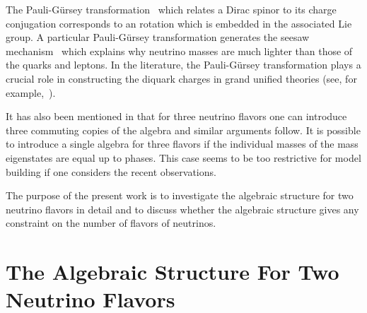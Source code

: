 \documentclass[a4paper,12pt]{article}
\begin{document}
The Pauli-G\"ursey transformation~\cite{pauli,gursey} which relates a Dirac spinor to its 
charge conjugation corresponds to an \coordHE{} rotation 
which is 
embedded in the  associated \coordHE{} Lie group. A particular Pauli-G\"ursey 
transformation generates the seesaw mechanism~\cite{seesaw} which explains why
neutrino masses are much lighter than those of the quarks and leptons. 
In the literature, the Pauli-G\"ursey transformation plays a crucial role in 
constructing the diquark charges in grand unified theories 
(see, for example,~\cite{saclioglu}). 

It has also been mentioned in \cite{baha} that 
for three neutrino flavors one can introduce three commuting copies of the
\coordHE{} algebra and similar arguments follow. It is possible to
introduce a single \coordHE{} algebra for three flavors if the individual
masses of the mass eigenstates  are equal up to phases. This case
seems to be too restrictive for model building if one considers 
the recent observations.

The purpose of the present work is to investigate the algebraic structure 
for two neutrino flavors in detail and to  discuss whether the algebraic 
structure gives any constraint on the number of flavors of neutrinos.

\section{The Algebraic Structure For Two Neutrino Flavors}
\end{document}
